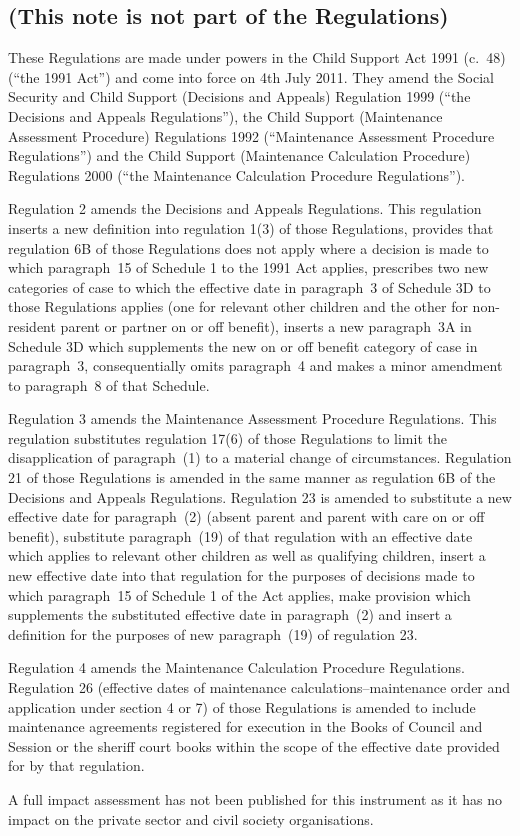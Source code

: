 \documentclass[12pt,a4paper]{article}
\begin{document}
\renewcommand\parthead{— Explanatory Note}

\subsection*{(This note is not part of the Regulations)}

These Regulations are made under powers in the Child Support Act 1991 (c.~48) (“the 1991 Act”) and come into force on 4th July 2011. They amend the Social Security and Child Support (Decisions and Appeals) Regulation 1999 (“the Decisions and Appeals Regulations”), the Child Support (Maintenance Assessment Procedure) Regulations 1992 (“Maintenance Assessment Procedure Regulations”) and the Child Support (Maintenance Calculation Procedure) Regulations 2000 (“the Maintenance Calculation Procedure Regulations”).

Regulation 2 amends the Decisions and Appeals Regulations. This regulation inserts a new definition into regulation 1(3) of those Regulations, provides that regulation 6B of those Regulations does not apply where a decision is made to which paragraph~15 of Schedule 1 to the 1991 Act applies, prescribes two new categories of case to which the effective date in paragraph~3 of Schedule 3D to those Regulations applies (one for relevant other children and the other for non-resident parent or partner on or off benefit), inserts a new paragraph~3A in Schedule 3D which supplements the new on or off benefit category of case in paragraph~3, consequentially omits paragraph~4 and makes a minor amendment to paragraph~8 of that Schedule.

Regulation 3 amends the Maintenance Assessment Procedure Regulations. This regulation substitutes regulation 17(6) of those Regulations to limit the disapplication of paragraph~(1) to a material change of circumstances. Regulation 21 of those Regulations is amended in the same manner as regulation 6B of the Decisions and Appeals Regulations. Regulation 23 is amended to substitute a new effective date for paragraph~(2) (absent parent and parent with care on or off benefit), substitute paragraph~(19) of that regulation with an effective date which applies to relevant other children as well as qualifying children, insert a new effective date into that regulation for the purposes of decisions made to which paragraph~15 of Schedule 1 of the Act applies, make provision which supplements the substituted effective date in paragraph~(2) and insert a definition for the purposes of new paragraph~(19) of regulation 23.

Regulation 4 amends the Maintenance Calculation Procedure Regulations. Regulation 26 (effective dates of maintenance calculations–maintenance order and application under section 4 or 7) of those Regulations is amended to include maintenance agreements registered for execution in the Books of Council and Session or the sheriff court books within the scope of the effective date provided for by that regulation.

A full impact assessment has not been published for this instrument as it has no impact on the private sector and civil society organisations. 
\end{document}
